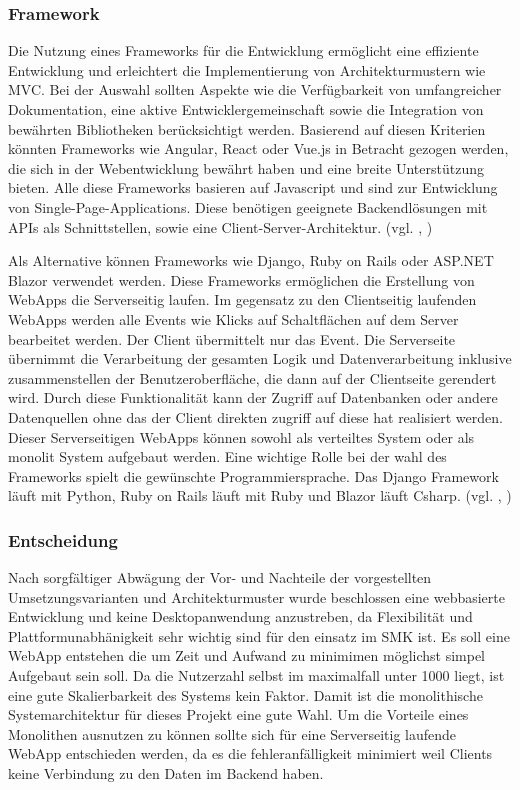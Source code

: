 \subsubsection{Framework}
\label{sec:Framework}
Die Nutzung eines Frameworks für die Entwicklung ermöglicht eine effiziente Entwicklung und erleichtert die Implementierung von Architekturmustern wie \zB MVC. Bei der Auswahl sollten Aspekte wie die Verfügbarkeit von umfangreicher Dokumentation, eine aktive Entwicklergemeinschaft sowie die Integration von bewährten Bibliotheken berücksichtigt werden. Basierend auf diesen Kriterien könnten Frameworks wie Angular, React oder Vue.js in Betracht gezogen werden, die sich in der Webentwicklung bewährt haben und eine breite Unterstützung bieten. Alle diese Frameworks basieren auf Javascript und sind zur Entwicklung von Single-Page-Applications. Diese benötigen geeignete Backendlösungen mit APIs als Schnittstellen, sowie eine  Client-Server-Architektur. (vgl. \cite{SPA}, \cite{serverside})

Als Alternative können Frameworks wie Django, Ruby on Rails oder ASP.NET Blazor verwendet werden. Diese Frameworks ermöglichen die Erstellung von WebApps die Serverseitig laufen. Im gegensatz zu den Clientseitig laufenden WebApps werden alle Events wie \zB Klicks auf Schaltflächen auf dem Server bearbeitet werden. Der Client übermittelt nur das Event. Die Serverseite übernimmt die Verarbeitung der gesamten Logik und Datenverarbeitung inklusive zusammenstellen der Benutzeroberfläche, die dann auf der Clientseite gerendert wird. Durch diese Funktionalität kann der Zugriff auf Datenbanken oder andere Datenquellen ohne das der Client direkten zugriff auf diese hat realisiert werden. Dieser Serverseitigen WebApps können sowohl als verteiltes System oder als monolit System aufgebaut werden. Eine wichtige Rolle bei der wahl des Frameworks spielt die gewünschte Programmiersprache. Das Django Framework läuft mit Python, Ruby on Rails läuft mit Ruby und Blazor läuft \bzw Csharp. (vgl. \cite{BalazorServer}, \cite{serverFrameworks})

\subsubsection{Entscheidung}
\label{sec:Entscheidung}
Nach sorgfältiger Abwägung der Vor- und Nachteile der vorgestellten Umsetzungsvarianten und Architekturmuster wurde beschlossen eine webbasierte Entwicklung und keine Desktopanwendung anzustreben, da Flexibilität und Plattformunabhänigkeit sehr wichtig sind für den einsatz im SMK ist. Es soll eine WebApp entstehen die um Zeit und Aufwand zu minimimen möglichst simpel Aufgebaut sein soll. Da die Nutzerzahl selbst im maximalfall unter 1000 liegt, ist eine gute Skalierbarkeit des Systems kein Faktor. Damit ist die monolithische Systemarchitektur für dieses Projekt eine gute Wahl. Um die Vorteile eines Monolithen ausnutzen zu können sollte sich für eine Serverseitig laufende WebApp entschieden werden, da es die fehleranfälligkeit minimiert weil Clients keine Verbindung zu den Daten im Backend haben.

